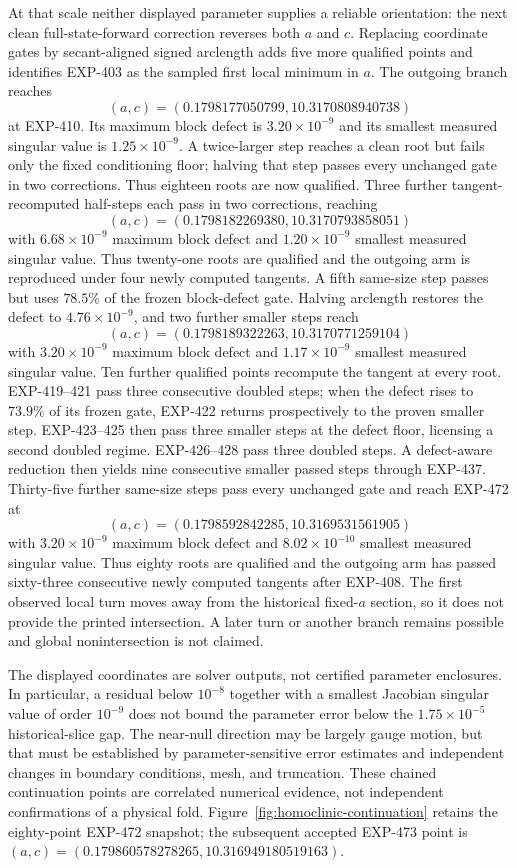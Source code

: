 At that scale neither displayed parameter supplies a reliable orientation:
the next clean full-state-forward correction reverses both $a$ and $c$.
Replacing coordinate gates by secant-aligned signed arclength adds five more
qualified points and identifies EXP-403 as the sampled first local minimum in
$a$.  The outgoing branch reaches
\[
  (a,c)=(0.1798177050799,10.3170808940738)
\]
at EXP-410.  Its maximum block defect is $3.20\times10^{-9}$ and its smallest
measured singular value is $1.25\times10^{-9}$.  A twice-larger step reaches a
clean root but fails only the fixed conditioning floor; halving that step
passes every unchanged gate in two corrections.  Thus eighteen roots are now
qualified.  Three further tangent-recomputed half-steps each pass in two
corrections, reaching
\[
  (a,c)=(0.1798182269380,10.3170793858051)
\]
with $6.68\times10^{-9}$ maximum block defect and
$1.20\times10^{-9}$ smallest measured singular value.  Thus twenty-one roots
are qualified and the outgoing arm is reproduced under four newly computed
tangents.  A fifth same-size step passes but uses $78.5\%$ of the frozen
block-defect gate.  Halving arclength restores the defect to
$4.76\times10^{-9}$, and two further smaller steps reach
\[
  (a,c)=(0.1798189322263,10.3170771259104)
\]
with $3.20\times10^{-9}$ maximum block defect and
$1.17\times10^{-9}$ smallest measured singular value.  Ten further qualified
points recompute the tangent at every root.  EXP-419--421 pass three
consecutive doubled steps; when the defect rises to $73.9\%$ of its frozen
gate, EXP-422 returns prospectively to the proven smaller step.  EXP-423--425
then pass three smaller steps at the defect floor, licensing a second doubled
regime.  EXP-426--428 pass three doubled steps.  A defect-aware reduction then
yields nine consecutive smaller passed steps through EXP-437. Thirty-five
further same-size steps pass every unchanged gate and reach EXP-472 at
\[
  (a,c)=(0.1798592842285,10.3169531561905)
\]
with $3.20\times10^{-9}$ maximum block defect and
$8.02\times10^{-10}$ smallest measured singular value.  Thus eighty roots
are qualified and the outgoing arm has passed sixty-three consecutive newly
computed tangents after EXP-408.  The first observed local turn moves away from
the historical fixed-$a$ section, so it does not provide the printed
intersection.  A later turn or another branch remains possible and global
nonintersection is not claimed.

The displayed coordinates are solver outputs, not certified parameter
enclosures.  In particular, a residual below $10^{-8}$ together with a
smallest Jacobian singular value of order $10^{-9}$ does not bound the
parameter error below the $1.75\times10^{-5}$ historical-slice gap.  The
near-null direction may be largely gauge motion, but that must be established
by parameter-sensitive error estimates and independent changes in boundary
conditions, mesh, and truncation.  These chained continuation points are
correlated numerical evidence, not independent confirmations of a physical
fold.  Figure~\ref{fig:homoclinic-continuation} retains the eighty-point
EXP-472 snapshot; the subsequent accepted EXP-473 point is
$(a,c)=(0.179860578278265,10.316949180519163)$.

